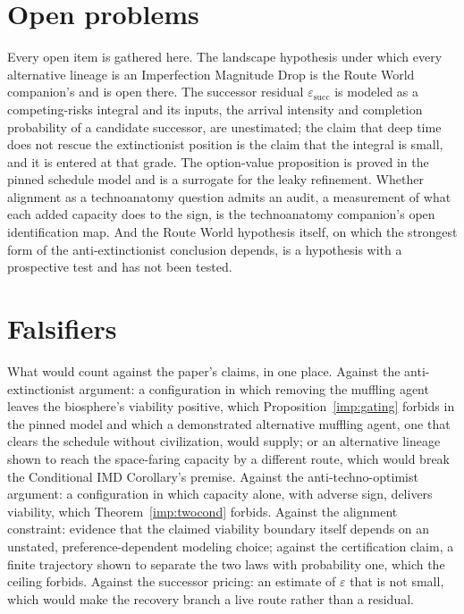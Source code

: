 \section{Open problems}\label{sec:open}

Every open item is gathered here. The landscape hypothesis under which
every alternative lineage is an Imperfection Magnitude Drop is the Route
World companion's and is open there. The successor residual
$\varepsilon_{\mathrm{succ}}$ is modeled as a competing-risks integral
and its inputs, the arrival intensity and completion probability of a
candidate successor, are unestimated; the claim that deep time does not
rescue the extinctionist position is the claim that the integral is
small, and it is entered at that grade. The option-value proposition is
proved in the pinned schedule model and is a surrogate for the leaky
refinement. Whether alignment as a technoanatomy question
admits an audit, a measurement of what each added capacity does to the
sign, is the technoanatomy companion's open identification map. And the
Route World hypothesis itself, on which the strongest form of the
anti-extinctionist conclusion depends, is a hypothesis with a
prospective test and has not been tested.

\section{Falsifiers}\label{sec:falsifiers}

What would count against the paper's claims, in one place. Against the
anti-extinctionist argument: a configuration in which removing the
muffling agent leaves the biosphere's viability positive, which
Proposition~\ref{imp:gating} forbids in the pinned model and which a
demonstrated alternative muffling agent, one that clears the schedule
without civilization, would supply; or an alternative lineage shown to
reach the space-faring capacity by a different route, which would break
the Conditional IMD Corollary's premise. Against the anti-techno-optimist
argument: a configuration in which capacity alone, with adverse sign,
delivers viability, which Theorem~\ref{imp:twocond} forbids. Against
the alignment constraint: evidence that the claimed viability boundary
itself depends on an unstated, preference-dependent modeling choice;
against the certification claim, a finite trajectory shown to separate the two laws
with probability one, which the ceiling forbids. Against the successor
pricing: an estimate of $\varepsilon$ that is not small, which would
make the recovery branch a live route rather than a residual.

